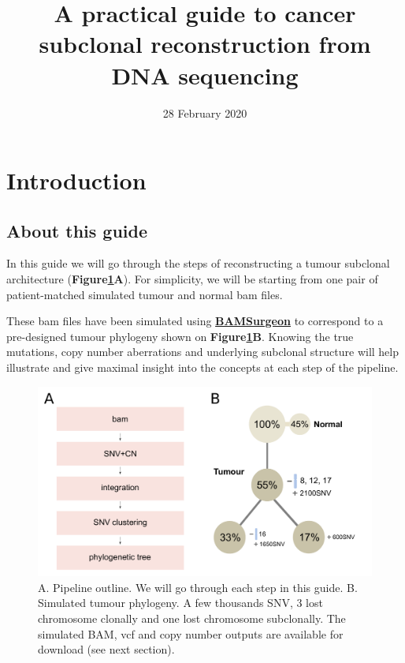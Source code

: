 \documentclass[]{article}
\title{A practical guide to cancer subclonal reconstruction from DNA sequencing}
\author{}
\date{28 February 2020}
\begin{document}
\maketitle

{
\setcounter{tocdepth}{2}
\tableofcontents
}
\newpage

\hypertarget{introduction}{%
\section{Introduction}\label{introduction}}

\hypertarget{about-this-guide}{%
\subsection{About this guide}\label{about-this-guide}}

In this guide we will go through the steps of reconstructing a tumour
subclonal architecture (\textbf{Figure\ref{Figure1}A}). For simplicity,
we will be starting from one pair of patient-matched simulated tumour
and normal bam files.

These bam files have been simulated using
\href{https://github.com/adamewing/bamsurgeon}{\textbf{BAMSurgeon}} to
correspond to a pre-designed tumour phylogeny shown on
\textbf{Figure\ref{Figure1}B}. Knowing the true mutations, copy number
aberrations and underlying subclonal structure will help illustrate and
give maximal insight into the concepts at each step of the pipeline.

\begin{figure}[H]
  \centering
  \includegraphics{figures/fig1_pipelineOutline.pdf}
  \caption{A. Pipeline outline. We will go through each step in this
  guide. B. Simulated tumour phylogeny. A few thousands SNV, 3 lost
  chromosome clonally and one lost chromosome subclonally. 
  The simulated BAM, vcf and copy number outputs are available
  for download (see next section).}
  \label{Figure1}
\end{figure}
\end{document}

